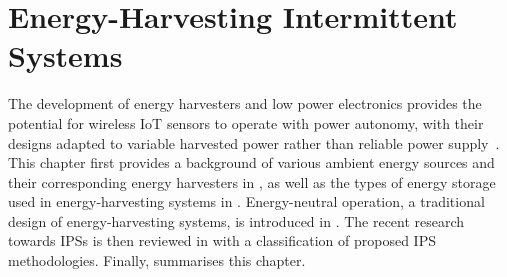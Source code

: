 \chapter{Energy-Harvesting Intermittent Systems} \label{chapter:review}

The development of energy harvesters and low power electronics provides the potential for wireless IoT sensors to operate with power autonomy, with their designs adapted to variable harvested power rather than reliable power supply~\cite{miorandi2012internet}. 
This chapter first provides a background of various ambient energy sources and their corresponding energy harvesters in , as well as the types of energy storage used in energy-harvesting systems in . 
Energy-neutral operation, a traditional design of energy-harvesting systems, is introduced in . 
The recent research towards IPSs is then reviewed in  with a classification of proposed IPS methodologies.
Finally,  summarises this chapter. 





